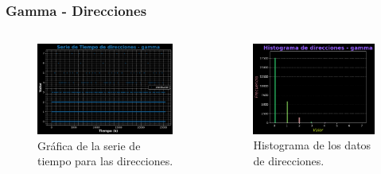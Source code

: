 \begin{frame}
	\frametitle{Gamma - Direcciones}
	
	\begin{columns}
		
		\begin{column}{0.5\textwidth} %
			\begin{figure}
				\centering
				\includegraphics[width=\textwidth]{graf_direcciones_gamma} %
				\caption{Gráfica de la serie de tiempo para las direcciones.}
			\end{figure}
		\end{column}
		
		\begin{column}{0.5\textwidth} %
			\begin{figure}
				\centering
				\includegraphics[width=\textwidth]{hist_direcciones_gamma} %
				\caption{Histograma de los datos de direcciones.}
			\end{figure}
		\end{column}
	\end{columns}
\end{frame}